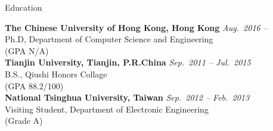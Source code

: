 

\begin{rSection}{Education}


{\bf The Chinese University of Hong Kong, Hong Kong} \hfill {\em Aug.~2016 -- } \\ 
Ph.D, Department of Computer Science and Engineering \\
(GPA N/A)\\
{\bf Tianjin University, Tianjin, P.R.China} \hfill {\em Sep.~2011 -- Jul.~2015} \\ 
B.S., Qiushi Honors Collage \\
(GPA 88.2/100)\\
{\bf National Tsinghua University, Taiwan} \hfill {\em Sep.~2012 -- Feb.~2013} \\ 
Visiting Student, Department of Electronic Engineering \\
(Grade A)


\end{rSection}
